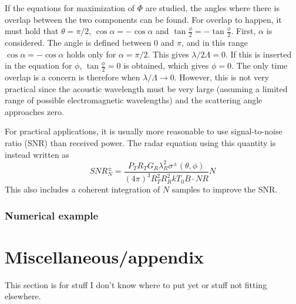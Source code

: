 \documentclass[10pt,a4paper,draft]{scrartcl}
\begin{document}
	If the equations for maximization of $\Phi$ are studied, the angles where there is overlap between the two components can be found. For overlap to happen, it must hold that $\theta = \pi/2$, $\cos{\alpha} = -\cos{\alpha}$ and $\tan{\frac{\phi}{2}} = -\tan{\frac{\phi}{2}}$. First, $\alpha$ is considered. The angle is defined between 0 and $\pi$, and in this range $\cos{\alpha} = -\cos{\alpha}$ holds only for $\alpha = \pi/2$. This gives $\lambda/2\Lambda = 0$. If this is inserted in the equation for $\phi$, $\tan{\frac{\phi}{2}} = 0$ is obtained, which gives $\phi = 0$. The only time overlap is a concern is therefore when $\lambda/\Lambda \rightarrow 0$. However, this is not very practical since the acoustic wavelength must be very large (assuming a limited range of possible electromagnetic wavelengths) and the scattering angle approaches zero.
	
	For practical applications, it is usually more reasonable to use signal-to-noise ratio (SNR) than received power. The radar equation using this quantity is instead written as
	\begin{equation*}
	\textit{SNR}^\pm_N = \frac{P_T R_T G_R \lambda_R^2 \sigma^\pm (\theta,\phi)}{(4\pi)^3 R_T^2 R_R^2 kT_0 B \cdot \mathit{NR}} N
	\end{equation*}
	This also includes a coherent integration of $N$ samples to improve the SNR.
	
	\subsubsection{Numerical example}
	
	\appendix
	
	\section{Miscellaneous/appendix}
	This section is for stuff I don't know where to put yet or stuff not fitting elsewhere.
	
\end{document}
